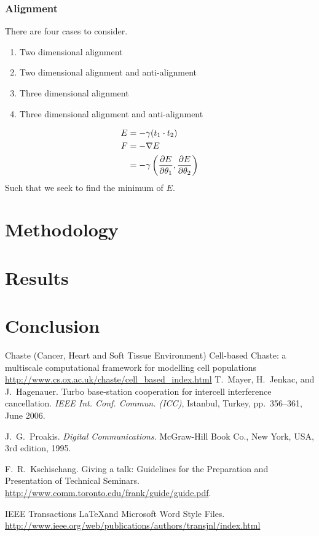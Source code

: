 \documentclass[journal, a4paper]{IEEEtran}
\begin{document}
\subsubsection{Alignment}
There are four cases to consider.
\begin{enumerate}
    \item Two dimensional alignment
    \item Two dimensional alignment and anti-alignment
    \item Three dimensional alignment
    \item Three dimensional alignment and anti-alignment
\end{enumerate}
\begin{align}
    E   & = -\gamma (t_1\cdot t_2) \\
    F   & = -\nabla E \\
        & = -\gamma \left(\pdv{E}{\theta_1},\pdv{E}{\theta_2}\right)
\end{align}
Such that we seek to find the minimum of $E$.
\section{Methodology}
\section{Results}
\section{Conclusion}
\begin{thebibliography}{5}

	Chaste (Cancer, Heart and Soft Tissue Environment) Cell-based Chaste: a multiscale computational framework for modelling cell populations
	\url{http://www.cs.ox.ac.uk/chaste/cell_based_index.html}
	T.~Mayer, H.~Jenkac, and J.~Hagenauer. Turbo base-station cooperation for intercell interference cancellation. {\em IEEE Int. Conf. Commun. (ICC)}, Istanbul, Turkey, pp.~356--361, June 2006.

	J.~G.~Proakis. {\em Digital Communications}. McGraw-Hill Book Co.,
	New York, USA, 3rd edition, 1995.

	F.~R.~Kschischang. Giving a talk: Guidelines for the Preparation and Presentation of Technical Seminars.
	\url{http://www.comm.toronto.edu/frank/guide/guide.pdf}.

	IEEE Transactions \LaTeX and Microsoft Word Style Files.
	\url{http://www.ieee.org/web/publications/authors/transjnl/index.html}

\end{thebibliography}

\end{document}
